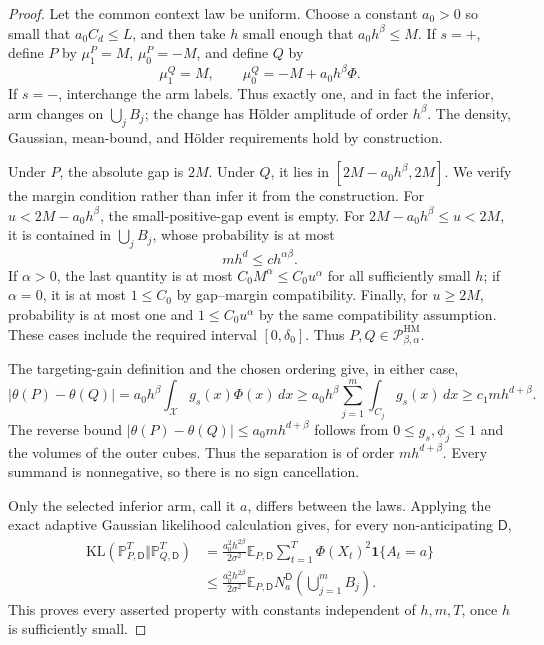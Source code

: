 \documentclass{article}
\begin{document}
\begin{proof}
Let the common context law be uniform.  Choose a constant \(a_0>0\) so small that \(a_0C_d\leq L\), and then take \(h\) small enough that \(a_0h^\beta\leq M\).  If \(s=+\), define \(P\) by \(\mu_1^P=M\), \(\mu_0^P=-M\), and define \(Q\) by
\[
\mu_1^Q=M,
\qquad
\mu_0^Q=-M+a_0h^\beta\Phi.
\]
If \(s=-\), interchange the arm labels.  Thus exactly one, and in fact the inferior, arm changes on \(\bigcup_jB_j\); the change has H\"older amplitude of order \(h^\beta\).  The density, Gaussian, mean-bound, and H\"older requirements hold by construction.

Under \(P\), the absolute gap is \(2M\).  Under \(Q\), it lies in \([2M-a_0h^\beta,2M]\).  We verify the margin condition rather than infer it from the construction.  For \(u<2M-a_0h^\beta\), the small-positive-gap event is empty.  For \(2M-a_0h^\beta\leq u<2M\), it is contained in \(\bigcup_jB_j\), whose probability is at most
\[
m h^d\leq c h^{\alpha\beta}.
\]
If \(\alpha>0\), the last quantity is at most \(C_0M^\alpha\leq C_0u^\alpha\) for all sufficiently small \(h\); if \(\alpha=0\), it is at most \(1\leq C_0\) by gap--margin compatibility.  Finally, for \(u\geq2M\), probability is at most one and \(1\leq C_0u^\alpha\) by the same compatibility assumption.  These cases include the required interval \([0,\delta_0]\).  Thus \(P,Q\in\mathcal P_{\beta,\alpha}^{\mathrm{HM}}\).

The targeting-gain definition and the chosen ordering give, in either case,
\[
|\theta(P)-\theta(Q)|
=a_0h^\beta\int_{\mathcal X}g_s(x)\Phi(x)\,dx
\geq a_0h^\beta\sum_{j=1}^m\int_{C_j}g_s(x)\,dx
\geq c_1mh^{d+\beta}.
\]
The reverse bound \(|\theta(P)-\theta(Q)|\leq a_0mh^{d+\beta}\) follows from \(0\leq g_s,\phi_j\leq1\) and the volumes of the outer cubes.  Thus the separation is of order \(mh^{d+\beta}\).  Every summand is nonnegative, so there is no sign cancellation.

Only the selected inferior arm, call it \(a\), differs between the laws.  Applying the exact adaptive Gaussian likelihood calculation gives, for every non-anticipating \(\mathsf D\),
\[
\begin{aligned}
\mathrm{KL}(\mathbb P_{P,\mathsf D}^{T}\Vert\mathbb P_{Q,\mathsf D}^{T})
&=\frac{a_0^2h^{2\beta}}{2\sigma^2}
  \mathbb E_{P,\mathsf D}\sum_{t=1}^T
  \Phi(X_t)^2\mathbf 1\{A_t=a\}\\
&\leq \frac{a_0^2h^{2\beta}}{2\sigma^2}
  \mathbb E_{P,\mathsf D}N_a^{\mathsf D}\!\left(\bigcup_{j=1}^mB_j\right).
\end{aligned}
\]
This proves every asserted property with constants independent of \(h,m,T\), once \(h\) is sufficiently small.
\end{proof}
\end{document}
